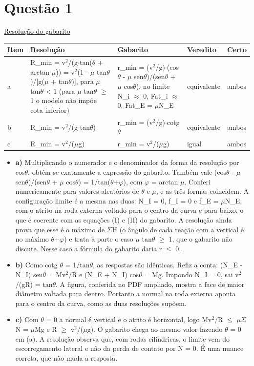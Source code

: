 \documentclass{article}%
\begin{document}
\section*{Questão 1}%
\href{https://poliedroresolve.sistemapoliedro.com.br/vestibulares/ita/2026/ita-2-fase-dia-3-30-10-2025-2-fase-dia-3/dissertativa-1-fisica-2-fase-dia-3-ita-2026}{Resolução do gabarito}\par\smallskip%
\begin{longtable}{@{}p{} p{} p{} p{} p{}@{}}\toprule Item & Resolução & Gabarito & Veredito & Certo \\ \midrule
a & R\_min = v$^2$/(g$\cdot$tan($\theta$ + arctan $\mu$)) = v$^2$(1 - $\mu$ tan$\theta$)/{[}g($\mu$ + tan$\theta$){]}, para $\mu$ tan$\theta$ < 1 (para $\mu$ tan$\theta$ $\geq$ 1 o modelo não impõe cota inferior) & r\_min = (v$^2$/g)$\cdot$(cos$\theta$ - $\mu$ sen$\theta$)/(sen$\theta$ + $\mu$ cos$\theta$), no limite N\_i $\approx$ 0, Fat\_i $\approx$ 0, Fat\_E = $\mu$N\_E & equivalente & ambos \\
b & R\_min = v$^2$/(g tan$\theta$) & r\_min = (v$^2$/g)$\cdot$cotg $\theta$ & equivalente & ambos \\
c & R\_min = v$^2$/($\mu$g) & r\_min = v$^2$/($\mu$g) & igual & ambos \\
\bottomrule\end{longtable}%
\begin{itemize}%
\item%
\textbf{a)} Multiplicando o numerador e o denominador da forma da resolução por cos$\theta$, obtém{-}se exatamente a expressão do gabarito. Também vale (cos$\theta$ - $\mu$ sen$\theta$)/(sen$\theta$ + $\mu$ cos$\theta$) = 1/tan($\theta$+$\varphi$), com $\varphi$ = arctan $\mu$. Conferi numericamente para valores aleatórios de $\theta$ e $\mu$, e as três formas coincidem. A configuração limite é a mesma nas duas: N\_I = 0, f\_I = 0 e f\_E = $\mu$N\_E, com o atrito na roda externa voltado para o centro da curva e para baixo, o que é coerente com as equações (I) e (II) do gabarito. A resolução ainda prova que esse é o máximo de $\Sigma$H (o ângulo de cada reação com a vertical é no máximo $\theta$+$\varphi$) e trata à parte o caso $\mu$ tan$\theta$ $\geq$ 1, que o gabarito não discute. Nesse caso a fórmula do gabarito daria r $\leq$ 0.%
\item%
\textbf{b)} Como cotg $\theta$ = 1/tan$\theta$, as respostas são idênticas. Refiz a conta: (N\_E - N\_I) sen$\theta$ = Mv$^2$/R e (N\_E + N\_I) cos$\theta$ = Mg. Impondo N\_I = 0, sai v$^2$/(gR) = tan$\theta$. A figura, conferida no PDF ampliado, mostra a face de maior diâmetro voltada para dentro. Portanto a normal na roda externa aponta para o centro da curva, como as duas resoluções supõem.%
\item%
\textbf{c)} Com $\theta$ = 0 a normal é vertical e o atrito é horizontal, logo Mv$^2$/R $\leq$ $\mu$$\Sigma$N = $\mu$Mg e R $\geq$ v$^2$/($\mu$g). O gabarito chega ao mesmo valor fazendo $\theta$ = 0 em (a). A resolução observa que, com rodas cilíndricas, o limite vem do escorregamento lateral e não da perda de contato por N = 0. É uma nuance correta, que não muda a resposta.%
\end{itemize}%
\end{document}
